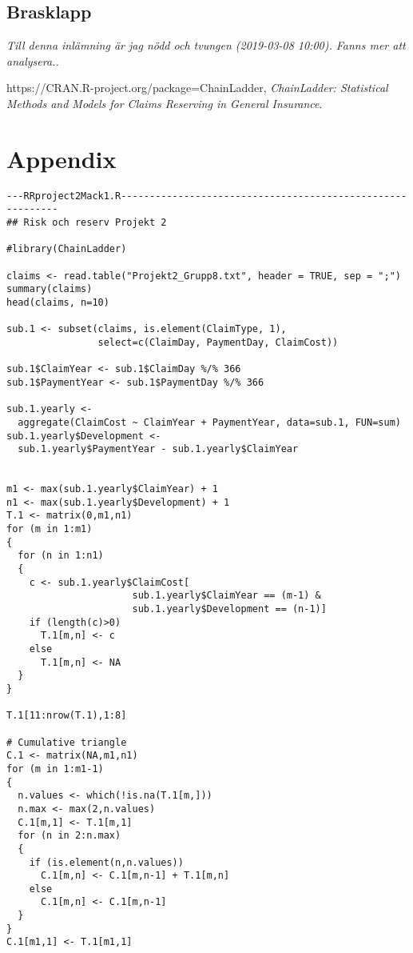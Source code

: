 \documentclass[a4paper]{article}
\begin{document}
\subsection*{Brasklapp}
{\it Till denna inlämning är jag nödd och tvungen (2019-03-08 10:00). Fanns mer att analysera..

\begin{thebibliography}{99}
   https://CRAN.R-project.org/package=ChainLadder,
  \emph{ChainLadder: Statistical Methods and Models for Claims Reserving in General Insurance}.
\end{thebibliography}

\section*{Appendix}

\begin{verbatim}
---RRproject2Mack1.R-----------------------------------------------------------
## Risk och reserv Projekt 2

#library(ChainLadder)

claims <- read.table("Projekt2_Grupp8.txt", header = TRUE, sep = ";")
summary(claims)
head(claims, n=10)

sub.1 <- subset(claims, is.element(ClaimType, 1),
                select=c(ClaimDay, PaymentDay, ClaimCost))

sub.1$ClaimYear <- sub.1$ClaimDay %/% 366
sub.1$PaymentYear <- sub.1$PaymentDay %/% 366

sub.1.yearly <-
  aggregate(ClaimCost ~ ClaimYear + PaymentYear, data=sub.1, FUN=sum)
sub.1.yearly$Development <-
  sub.1.yearly$PaymentYear - sub.1.yearly$ClaimYear


m1 <- max(sub.1.yearly$ClaimYear) + 1
n1 <- max(sub.1.yearly$Development) + 1
T.1 <- matrix(0,m1,n1)
for (m in 1:m1)
{
  for (n in 1:n1)
  {
    c <- sub.1.yearly$ClaimCost[
                      sub.1.yearly$ClaimYear == (m-1) &
                      sub.1.yearly$Development == (n-1)]
    if (length(c)>0)
      T.1[m,n] <- c
    else
      T.1[m,n] <- NA
  }
}

T.1[11:nrow(T.1),1:8]

# Cumulative triangle
C.1 <- matrix(NA,m1,n1)
for (m in 1:m1-1)
{
  n.values <- which(!is.na(T.1[m,]))
  n.max <- max(2,n.values)
  C.1[m,1] <- T.1[m,1]
  for (n in 2:n.max)
  {
    if (is.element(n,n.values))
      C.1[m,n] <- C.1[m,n-1] + T.1[m,n]
    else
      C.1[m,n] <- C.1[m,n-1]
  }
}
C.1[m1,1] <- T.1[m1,1]


\end{verbatim}}
\end{document}
